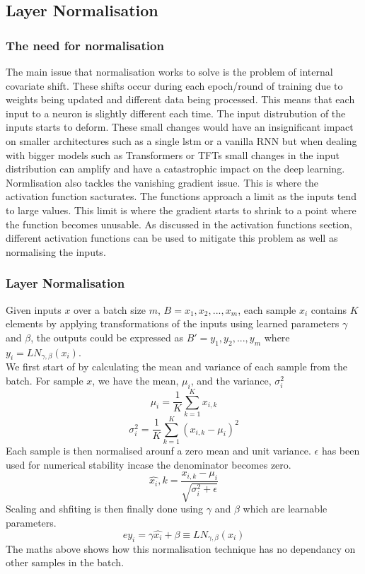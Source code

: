 \documentclass{article}
\begin{document}
\subsection{Layer Normalisation}

\subsubsection{The need for normalisation}
The main issue that normalisation works to solve is the problem of internal
covariate shift. These shifts occur during each epoch/round of training due to weights
being updated and different data being processed. This means that each input to a
neuron is slightly different each time. The input distrubution of the inputs starts
to deform.
These small changes would have an insignificant impact on smaller architectures
such as a single lstm or a vanilla RNN but when dealing with bigger models such as Transformers
or TFTs small changes in the input distribution can amplify and have a catastrophic
impact on the deep learning.
Normlisation also tackles the vanishing gradient issue. This is where the activation
function sacturates. The functions approach a limit as the inputs tend to large values.
This limit is where the gradient starts to shrink to a point where the function becomes
unusable. As discussed in the activation functions section, different activation functions
can be used to mitigate this problem as well as normalising the inputs.

\subsubsection{Layer Normalisation}


Given inputs $x$ over a batch size $m$, $B = {x_1,x_2, ..., x_m}$, each sample $x_i$ contains $K$ elements by applying transformations of the inputs using learned parameters
$\gamma$ and $\beta$, the outputs could be expressed as $B' = {y_1,y_2,...,y_m}$ where
$y_i=LN_{\gamma,\beta}(x_i)$. \\
We first start of by calculating the mean and variance of each sample from the batch.
For sample $x$, we have the mean, $\mu_i$, and the variance, $\sigma_i^2$
$$\mu_i = \frac{1}{K}\sum^K_{k=1}x_{i,k}$$
$$\sigma_i^2 = \frac{1}{K}\sum^K_{k=1}(x_{i,k}-\mu_i)^2$$
Each sample is then normalised arounf a zero mean and unit variance. $\epsilon$ has been used for numerical stability incase the denominator becomes zero.
$$\hat{x_i},k= \frac{x_{i,k}-\mu_i}{\sqrt{\sigma_i^2+\epsilon}}$$
Scaling and shfiting is then finally done using $\gamma$ and $\beta$ which are learnable parameters.
$$ey_i = \gamma \hat{x_i}+\beta \equiv LN_{\gamma,\beta}(x_i)$$
The maths above shows how this normalisation technique has no dependancy on other samples in the batch.
\end{document}
